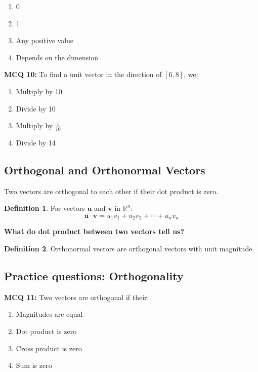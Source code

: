 \documentclass[11pt,a4paper]{article}
\theoremstyle{definition}
\newtheorem{definition}{Definition}[section]
\begin{document}
\begin{enumerate}
    \item 0
    \item 1
    \item Any positive value
    \item Depends on the dimension
\end{enumerate}

\noindent \textbf{MCQ 10:} To find a unit vector in the direction of $[6, 8]$, we:

\begin{enumerate}
    \item Multiply by 10
    \item Divide by 10
    \item Multiply by $\frac{1}{10}$
    \item Divide by 14
\end{enumerate}


\subsection{Orthogonal and Orthonormal Vectors}

Two vectors are orthogonal to each other if their dot product is zero.

\begin{defbox}
\begin{definition}
For vectors $\mathbf{u}$ and $\mathbf{v}$ in $\mathbb{R}^n$:
\[\mathbf{u} \cdot \mathbf{v} = u_1v_1 + u_2v_2 + \cdots + u_nv_n\]
\end{definition}
\end{defbox}


\textbf{What do dot product between two vectors tell us?} \\


\begin{defbox}
\begin{definition}
Orthonormal vectors are orthogonal vectors with unit magnitude.
\end{definition}
\end{defbox}



\subsection{Practice questions: Orthogonality}

\textbf{MCQ 11:} Two vectors are orthogonal if their:

\begin{enumerate}
    \item Magnitudes are equal
    \item Dot product is zero
    \item Cross product is zero
    \item Sum is zero
\end{enumerate}
\end{document}
